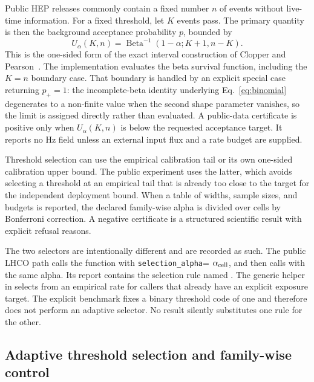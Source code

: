 \documentclass[preprint,12pt]{elsarticle}
\begin{document}
Public HEP releases commonly contain a fixed number $n$ of events without
live-time information.  For a fixed threshold, let $K$ events pass.  The
primary quantity is then the background acceptance probability $p$, bounded by
\begin{equation}
 U_\alpha(K,n)=\operatorname{Beta}^{-1}(1-\alpha;K+1,n-K).
 \label{eq:binomial}
\end{equation}
This is the one-sided form of the exact interval construction of
Clopper and Pearson~\cite{Clopper1934}.
The implementation evaluates the beta survival function, including the
$K=n$ boundary case.  That boundary is handled by an explicit special case
returning $p_+=1$: the incomplete-beta identity underlying
Eq.~\eqref{eq:binomial} degenerates to a non-finite value when the second shape
parameter vanishes, so the limit is assigned directly rather than evaluated.
A public-data certificate is positive only when
$U_\alpha(K,n)$ is below the requested acceptance target.  It reports no Hz
field unless an external input flux and a rate budget are supplied.

Threshold selection can use the empirical calibration tail or its own
one-sided calibration upper bound.  The public experiment uses the latter,
which avoids selecting a threshold at an empirical tail that is already too
close to the target for the independent deployment bound.  When a table of
widths, sample sizes, and budgets is reported, the declared family-wise alpha is
divided over cells by Bonferroni correction.  A negative certificate is a
structured scientific result with explicit refusal reasons.

The two selectors are intentionally different and are recorded as such.  The
public LHCO path calls the function
 with
\texttt{selection\_alpha}= $\alpha_{\rm cell}$, and then calls
 with the same alpha.  Its report contains the
selection rule named .  The generic
 helper in  selects from an empirical
rate for callers that already have an explicit exposure target.  The explicit
benchmark fixes a binary threshold code of one and therefore does not perform
an adaptive selector.  No result silently substitutes one rule for the other.

\subsection{Adaptive threshold selection and family-wise control}
\end{document}

